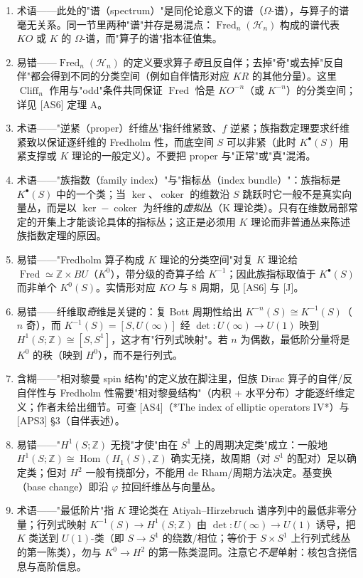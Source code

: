 \documentclass[11pt]{amsart}
\theoremstyle{definition}
\theoremstyle{remark}
\theoremstyle{plain}
\numberwithin{equation}{section}
\renewcommand{\:}{\colon}
\DeclareMathOperator{\Hom}{Hom}
\newcommand{\ZZ}{{\mathbb Z}}
\newcommand{\cir}{S^1}
\DeclareMathOperator{\coker}{coker}
\DeclareMathOperator{\Cliff}{Cliff}
\DeclareMathOperator{\Fred}{Fred}
\newcommand{\Cn}{\Cliff_{n}}
\newcommand{\Fn}{\Fred_n}
\newcommand{\sH}{\mathscr{H}}
\begin{document}
\begin{enumerate}[leftmargin=2.2em,itemsep=2pt,topsep=2pt]
  \item 术语——此处的"谱（spectrum）"是同伦论意义下的谱（$\Omega$-谱），与算子的谱毫无关系。同一节里两种"谱"并存是易混点：$\Fn(\sH_n)$ 构成的谱代表 $KO$ 或 $K$ 的 $\Omega$-谱，而"算子的谱"指本征值集。
  \item 易错——$\Fn(\sH_n)$ 的定义要求算子\emph{奇}且反自伴；去掉"奇"或去掉"反自伴"都会得到不同的分类空间（例如自伴情形对应 $KR$ 的其他分量）。这里 $\Cn$ 作用与"odd"条件共同保证 $\Fred$ 恰是 $KO^{-n}$（或 $K^{-n}$）的分类空间；详见 [AS6] 定理 A。
  \item 术语——"逆紧（proper）纤维丛"指纤维紧致、$f$ 逆紧；族指数定理要求纤维紧致以保证逐纤维的 Fredholm 性，而底空间 $S$ 可以非紧（此时 $K^{\bullet }(S)$ 用紧支撑或 $K$ 理论的一般定义）。不要把 proper 与"正常"或"真"混淆。
  \item 术语——"族指数（family index）"与"指标丛（index bundle）"：族指标是 $K^{\bullet }(S)$ 中的一个类；当 $\ker$、$\coker$ 的维数沿 $S$ 跳跃时它一般不是真实向量丛，而是以 $\ker-\coker$ 为纤维的\emph{虚拟}丛（K 理论类）。只有在维数局部常定的开集上才能谈论具体的指标丛；这正是必须用 $K$ 理论而非普通丛来陈述族指数定理的原因。
  \item 易错——"Fredholm 算子构成 $K$ 理论的分类空间"对复 $K$ 理论给 $\Fred\simeq \ZZ\times BU$（$K^0$），带分级的奇算子给 $K^{-1}$；因此族指标取值于 $K^{\bullet }(S)$ 而非单个 $K^0(S)$。实情形对应 $KO$ 与 8 周期，见 [AS6] 与 [J]。
  \item 易错——纤维取\emph{奇}维是关键的：复 Bott 周期性给出 $K^{-n}(S)\cong K^{-1}(S)$（$n$ 奇），而 $K^{-1}(S)=[S,U(\infty)]$ 经 $\det:U(\infty)\to U(1)$ 映到 $H^1(S;\ZZ)\cong[S,S^1]$，这才有"行列式映射"。若 $n$ 为偶数，最低阶分量将是 $K^0$ 的秩（映到 $H^0$），而不是行列式。
  \item 含糊——"相对黎曼 spin 结构"的定义放在脚注里，但族 Dirac 算子的自伴/反自伴性与 Fredholm 性需要"相对黎曼结构"（内积 + 水平分布）才能逐纤维定义；作者未给出细节。可查 [AS4]（*The index of elliptic operators IV*）与 [APS3] §3（自伴表述）。
  \item 易错——"$H^1(S;\ZZ)$ 无挠"才使"由在 $\cir$ 上的周期决定类"成立：一般地 $H^1(S;\ZZ)\cong\Hom(H_1(S),\ZZ)$ 确实无挠，故周期（对 $S^1$ 的配对）足以确定类；但对 $H^2$ 一般有挠部分，不能用 de Rham/周期方法决定。基变换（base change）即沿 $\varphi $ 拉回纤维丛与向量丛。
  \item 术语——"最低阶片"指 $K$ 理论类在 Atiyah–Hirzebruch 谱序列中的最低非零分量；行列式映射 $K^{-1}(S)\to H^1(S;\ZZ)$ 由 $\det:U(\infty)\to U(1)$ 诱导，把 $K$ 类送到 $U(1)$-类（即 $S\to S^1$ 的绕数/相位；等价于 $S\times S^1$ 上行列式线丛的第一陈类），勿与 $K^0\to H^2$ 的第一陈类混同。注意它\emph{不是}单射：核包含挠信息与高阶信息。

\end{enumerate}
\end{document}
